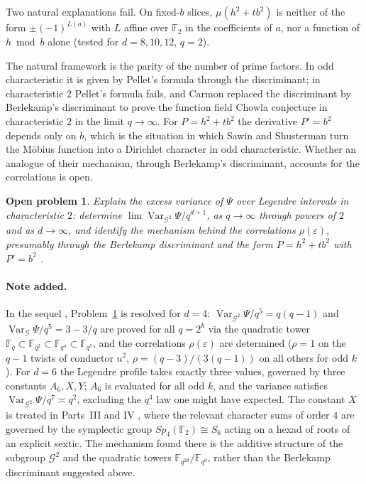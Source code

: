 \documentclass[11pt,a4paper]{article}
\newtheorem{problem}[theorem]{Open problem}
\theoremstyle{definition}
\theoremstyle{remark}
\newcommand{\Fq}{\mathbb{F}_q}
\newcommand{\cG}{\mathcal{G}}
\newcommand{\Var}{\operatorname{Var}}
\begin{document}
Two natural explanations fail. On fixed-$b$ slices, $\mu(h^2+tb^2)$ is neither of the form
$\pm(-1)^{L(a)}$ with $L$ affine over $\mathbb F_2$ in the coefficients of $a$, nor a function of
$h\bmod b$ alone (tested for $d=8,10,12$, $q=2$).

The natural framework is the parity of the number of prime factors. In odd characteristic it is given by
Pellet's formula through the discriminant; in characteristic $2$ Pellet's formula fails, and Carmon
\cite{Carmon2015} replaced the discriminant by Berlekamp's discriminant to prove the function field Chowla
conjecture in characteristic $2$ in the limit $q\to\infty$. For $P=h^2+tb^2$ the derivative $P'=b^2$ depends
only on $b$, which is the situation in which Sawin and Shusterman \cite{SawinShusterman2022} turn the
M\"obius function into a Dirichlet character in odd characteristic. Whether an analogue of their mechanism,
through Berlekamp's discriminant, accounts for the correlations is open.

\begin{problem}\label{prob:char2}
Explain the excess variance of $\Psi$ over Legendre intervals in characteristic $2$: determine
$\lim\Var_{\cG^2}\Psi/q^{d+1}$, as $q\to\infty$ through powers of $2$ and as $d\to\infty$, and identify
the mechanism behind the correlations $\rho(\varepsilon)$, presumably through the Berlekamp discriminant
and the form $P=h^2+tb^2$ with $P'=b^2$ \cite{Carmon2015,SawinShusterman2022}.
\end{problem}

\paragraph{Note added.}
In the sequel \cite{Chen2026b}, Problem~\ref{prob:char2} is resolved for $d=4$:
$\Var_{\cG^2}\Psi/q^5=q(q-1)$ and $\Var_{\cG}\Psi/q^5=3-3/q$ are proved for all $q=2^k$
via the quadratic tower $\Fq\subset\mathbb F_{q^2}\subset\mathbb F_{q^4}\subset\mathbb F_{q^8}$,
and the correlations $\rho(\varepsilon)$ are determined ($\rho=1$ on the $q-1$ twists of conductor $u^2$,
$\rho=(q-3)/(3(q-1))$ on all others for odd $k$). For $d=6$ the Legendre profile takes exactly
three values, governed by three constants $A_6,X,Y$; $A_6$ is evaluated for all odd $k$, and the variance
satisfies $\Var_{\cG^2}\Psi/q^7\asymp q^2$, excluding the $q^4$ law one might have expected. The constant
$X$ is treated in Parts~III and IV \cite{Chen2026c,Chen2026d}, where the relevant character sums of order
$4$ are governed by the symplectic group $Sp_4(\mathbb F_2)\cong S_6$ acting on a hexad of roots of an
explicit sextic. The mechanism found there is the additive structure of the subgroup $\cG^2$ and the
quadratic towers $\mathbb F_{q^{2d}}/\mathbb F_{q^d}$, rather than the Berlekamp discriminant suggested above.
\end{document}
